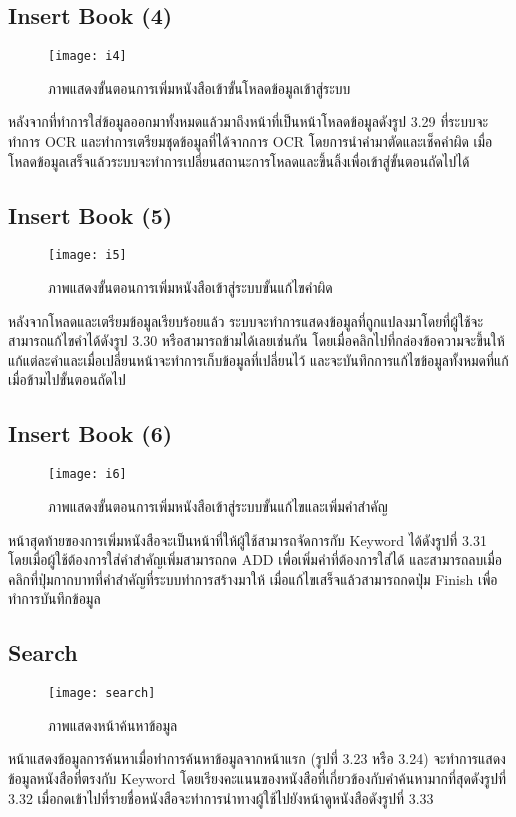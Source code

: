 \subsection{Insert Book (4)}
\begin{figure}[H]
    \centering
    \texttt{[image: i4]}
    \caption{ภาพแสดงขั้นตอนการเพิ่มหนังสือเข้าขั้นโหลดข้อมูลเข้าสู่ระบบ}\label{fig:i4}
\end{figure}
หลังจากที่ทำการใส่ข้อมูลออกมาทั้งหมดแล้วมาถึงหน้าที่เป็นหน้าโหลดข้อมูลดังรูป 3.29 ที่ระบบจะทำการ OCR และทำการเตรียมชุดข้อมูลที่ได้จากการ OCR โดยการนำคำมาตัดและเช็คคำผิด เมื่อโหลดข้อมูลเสร็จแล้วระบบจะทำการเปลี่ยนสถานะการโหลดและขึ้นลิ้งเพื่อเข้าสู่ขั้นตอนถัดไปได้

\subsection{Insert Book (5)}
\begin{figure}[H]
    \centering
    \texttt{[image: i5]}
    \caption{ภาพแสดงขั้นตอนการเพิ่มหนังสือเข้าสู่ระบบขั้นแก้ไขคำผิด}\label{fig:i5}
\end{figure}
หลังจากโหลดและเตรียมข้อมูลเรียบร้อยแล้ว ระบบจะทำการแสดงข้อมูลที่ถูกแปลงมาโดยที่ผู้ใช้จะสามารถแก้ไขคำได้ดังรูป 3.30 หรือสามารถข้ามได้เลยเช่นกัน โดยเมื่อคลิกไปที่กล่องข้อความจะขึ้นให้แก้แต่ละคำและเมื่อเปลี่ยนหน้าจะทำการเก็บข้อมูลที่เปลี่ยนไว้ และจะบันทึกการแก้ไขข้อมูลทั้งหมดที่แก้เมื่อข้ามไปขั้นตอนถัดไป

\subsection{Insert Book (6) }
\begin{figure}[H]
    \centering
    \texttt{[image: i6]}
    \caption{ภาพแสดงขั้นตอนการเพิ่มหนังสือเข้าสู่ระบบขั้นแก้ไขและเพิ่มคำสำคัญ}\label{fig:i6}
\end{figure}
หน้าสุดท้ายของการเพิ่มหนังสือจะเป็นหน้าที่ให้ผู้ใช้สามารถจัดการกับ Keyword ได้ดังรูปที่ 3.31 โดยเมื่อผู้ใช้ต้องการใส่คำสำคัญเพิ่มสามารถกด ADD เพื่อเพิ่มคำที่ต้องการใส่ได้ และสามารถลบเมื่อคลิกที่ปุ่มกากบาทที่คำสำคัญที่ระบบทำการสร้างมาให้ เมื่อแก้ไขเสร็จแล้วสามารถกดปุ่ม Finish เพื่อทำการบันทึกข้อมูล

\subsection{Search}
\begin{figure}[H]
    \centering
    \texttt{[image: search]}
    \caption{ภาพแสดงหน้าค้นหาข้อมูล}\label{fig:search}
\end{figure}
หน้าแสดงข้อมูลการค้นหาเมื่อทำการค้นหาข้อมูลจากหน้าแรก (รูปที่ 3.23 หรือ 3.24) จะทำการแสดงข้อมูลหนังสือที่ตรงกับ Keyword โดยเรียงคะแนนของหนังสือที่เกี่ยวข้องกับคำค้นหามากที่สุดดังรูปที่ 3.32 เมื่อกดเข้าไปที่รายชื่อหนังสือจะทำการนำทางผู้ใช้ไปยังหน้าดูหนังสือดังรูปที่ 3.33

